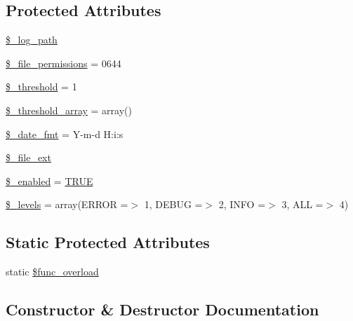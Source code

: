\subsection*{Protected Attributes}
\begin{DoxyCompactItemize}
\item 
\mbox{\hyperlink{class_c_i___log_a3eaf9e92941ee6be33bc972ab76b4caf}{\$\+\_\+log\+\_\+path}}
\item 
\mbox{\hyperlink{class_c_i___log_a8a805f532669024e8868a5cca0d6f97b}{\$\+\_\+file\+\_\+permissions}} = 0644
\item 
\mbox{\hyperlink{class_c_i___log_a0fc9914bdaf300fa9a1745201204e73f}{\$\+\_\+threshold}} = 1
\item 
\mbox{\hyperlink{class_c_i___log_a95562d965f341c55d2c997ed12b4b721}{\$\+\_\+threshold\+\_\+array}} = array()
\item 
\mbox{\hyperlink{class_c_i___log_aab5c1870169c8e04ede18245f04ad85c}{\$\+\_\+date\+\_\+fmt}} = \textquotesingle{}Y-\/m-\/d H\+:i\+:s\textquotesingle{}
\item 
\mbox{\hyperlink{class_c_i___log_ad0c7fa3db6c5e41616bbdf4719492518}{\$\+\_\+file\+\_\+ext}}
\item 
\mbox{\hyperlink{class_c_i___log_af8233d47e8ad3e624ba168154d2f383d}{\$\+\_\+enabled}} = \mbox{\hyperlink{constants_8php_ae04a3efe6aa42044f803ee90c2277846}{T\+R\+UE}}
\item 
\mbox{\hyperlink{class_c_i___log_aeb1c4747136537731b6cfed6f1e64941}{\$\+\_\+levels}} = array(\textquotesingle{}E\+R\+R\+OR\textquotesingle{} =$>$ 1, \textquotesingle{}D\+E\+B\+UG\textquotesingle{} =$>$ 2, \textquotesingle{}I\+N\+FO\textquotesingle{} =$>$ 3, \textquotesingle{}A\+LL\textquotesingle{} =$>$ 4)
\end{DoxyCompactItemize}
\subsection*{Static Protected Attributes}
\begin{DoxyCompactItemize}
\item 
static \mbox{\hyperlink{class_c_i___log_aef84be58d58a5895572c5689e56a1047}{\$func\+\_\+overload}}
\end{DoxyCompactItemize}


\subsection{Constructor \& Destructor Documentation}
\mbox{\label{class_c_i___log_a095c5d389db211932136b53f25f39685}} 
